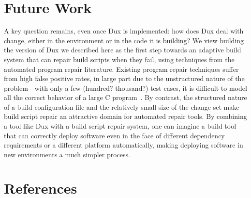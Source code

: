 \documentclass[10pt,conference]{IEEEtran}
\begin{document}
\section{Future Work}
A key question remains, even once Dux is implemented: how does Dux deal with
change, either in the environment or in the code it is building? We view building
the version of Dux we described here as the first step towards an adaptive
build system that can repair build scripts when they fail, using techniques
from the automated program repair literature. Existing program repair techniques
suffer from high false positive rates, in large part due to the unstructured
nature of the problem---with only a few (hundred? thousand?) test cases, it is
difficult to model all the correct behavior of a large C program~\cite{genprogisbadrinard}.
By contrast, the structured nature of a build configuration file and the relatively
small size of the change set make build script repair an attractive domain for
automated repair tools. By combining a tool like Dux with a build script repair
system, one can imagine a build tool that can correctly deploy software even in
the face of different dependency requirements or a different platform automatically,
making deploying software in new environments a much simpler process.

\section{References}

\begingroup
\renewcommand{\section}[2]{}%



%
%
\endgroup
\end{document}
